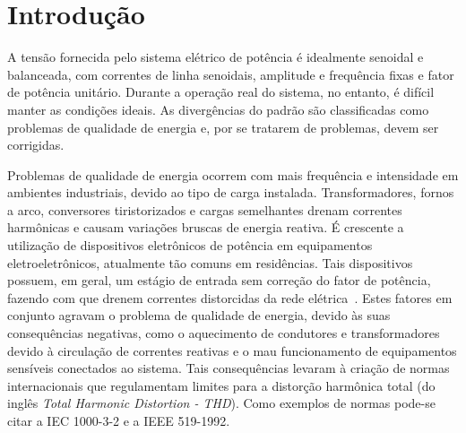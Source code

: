 
\chapter{Introdução}\label{introducao}


	A tensão fornecida pelo sistema elétrico de potência é idealmente senoidal e balanceada, com correntes de linha senoidais, amplitude e frequência fixas e fator de potência unitário. Durante a operação real do sistema, no entanto, é difícil manter as condições ideais. As divergências do padrão são classificadas como problemas de qualidade de energia e, por se tratarem de problemas, devem ser corrigidas.

	Problemas de qualidade de energia ocorrem com mais frequência e intensidade em ambientes industriais, devido ao tipo de carga instalada. Transformadores, fornos a arco, conversores tiristorizados e cargas semelhantes drenam correntes harmônicas e causam variações bruscas de energia reativa. É crescente a utilização de dispositivos eletrônicos de potência em equipamentos eletroeletrônicos, atualmente tão comuns em residências. Tais dispositivos possuem, em geral, um estágio de entrada sem correção do fator de potência, fazendo com que drenem correntes distorcidas da rede elétrica~\cite{ref:MANSOOR}. Estes fatores em conjunto agravam o problema de qualidade de energia, devido às suas consequências negativas, como	o aquecimento de condutores e transformadores devido à circulação de correntes reativas e o mau funcionamento de equipamentos sensíveis conectados ao sistema.	Tais consequências levaram à criação de normas internacionais que regulamentam limites para a distorção harmônica total (do inglês \emph{Total Harmonic Distortion - THD}). Como exemplos de normas pode-se citar a IEC 1000-3-2 e a IEEE 519-1992.

